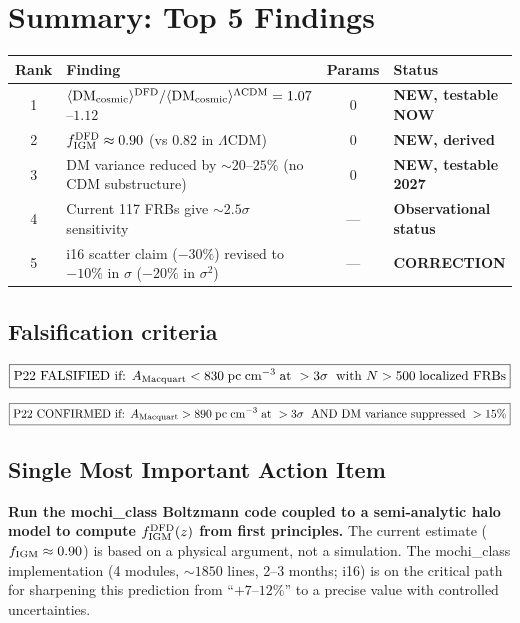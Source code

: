 \documentclass[11pt]{article}
\newcommand{\LCDM}{$\Lambda$CDM}
\newcommand{\fIGM}{f_{\rm IGM}}
\newcommand{\DMcosmic}{\langle\mathrm{DM}_{\rm cosmic}\rangle}
\newcommand{\pc}{\;\mathrm{pc\;cm}^{-3}}
\begin{document}
\section{Summary: Top 5 Findings}
\label{sec:summary}

\begin{center}
\small
\begin{tabular}{clcl}
\toprule
\textbf{Rank} & \textbf{Finding} & \textbf{Params} & \textbf{Status} \\
\midrule
1 & $\DMcosmic^{\rm DFD}/\DMcosmic^{\rm \Lambda CDM} = 1.07$--$1.12$
  & 0 & \textbf{NEW, testable NOW} \\
2 & $\fIGM^{\rm DFD} \approx 0.90$ (vs 0.82 in \LCDM)
  & 0 & \textbf{NEW, derived} \\
3 & DM variance reduced by $\sim 20$--$25\%$ (no CDM substructure)
  & 0 & \textbf{NEW, testable 2027} \\
4 & Current 117 FRBs give $\sim 2.5\sigma$ sensitivity
  & --- & \textbf{Observational status} \\
5 & i16 scatter claim ($-30\%$) revised to $-10\%$ in $\sigma$
  ($-20\%$ in $\sigma^2$) & --- & \textbf{CORRECTION} \\
\bottomrule
\end{tabular}
\end{center}

\subsection{Falsification criteria}

\begin{equation}
\boxed{
\text{P22 FALSIFIED if: }
A_{\rm Macquart} < 830\pc\;\text{at } > 3\sigma
\;\text{ with } N > 500\;\text{localized FRBs}
}
\end{equation}

\begin{equation}
\boxed{
\text{P22 CONFIRMED if: }
A_{\rm Macquart} > 890\pc\;\text{at } > 3\sigma
\;\text{ AND DM variance suppressed } > 15\%
}
\end{equation}

\subsection{Single Most Important Action Item}

\textbf{Run the mochi\_class Boltzmann code coupled to a semi-analytic
halo model to compute $\fIGM^{\rm DFD}(z)$ from first principles.}
The current estimate ($\fIGM \approx 0.90$) is based on a physical
argument, not a simulation.  The mochi\_class implementation (4 modules,
$\sim 1850$ lines, 2--3 months; i16) is on the critical path for
sharpening this prediction from ``$+7$--$12\%$'' to a precise value
with controlled uncertainties.
\end{document}
